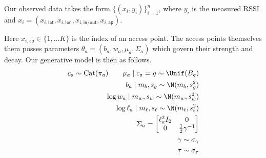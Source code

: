 \documentclass{article}
\newcommand{\sfio}{\mathsf{in/out}}
\newcommand{\sflat}{\mathsf{lat}}
\newcommand{\sflon}{\mathsf{lon}}
\newcommand{\sfap}{\mathsf{ap}}
\begin{document}
Our observed data takes the form $\{(x_i, y_i)\}_{i = 1} ^n$, where $y_i$ is the measured RSSI and $x_i = (x_{i,\sflat}, x_{i,\sflon}, x_{i,\sfio}, x_{i,\sfap})$. 

Here $x_{i,\sfap} \in \{1, \dots K\}$ is the index of an access point. The access points themselves them posses parameters $\theta_a = (b_a, w_a, \mu_a, \Sigma_a)$ which govern their strength and decay. Our generative model is then as follows.
\begin{align*}
    c_a \sim \mathrm{Cat}(\pi_a)  \qquad \mu_a \mid c_a = g \sim \Unif(B_g) \\
    b_a \mid m_b, s_g \sim \N(m_b, s_g^2) \\
    \log w_a  \mid m_w, s_w \sim \N(m_w, s_w^2) \\
    \log \ell_a \mid m_\ell, s_\ell \sim \N(m_\ell, s_\ell^2) \\
    \Sigma_a = \begin{bmatrix}
        \ell_a^2 I_{2} & 0 \\
        0 & \frac{1}{2}\gamma^{-1}
    \end{bmatrix} \\
    \gamma \sim \sigma_\gamma \\
    \tau \sim \sigma_\tau
\end{align*}
\end{document}
